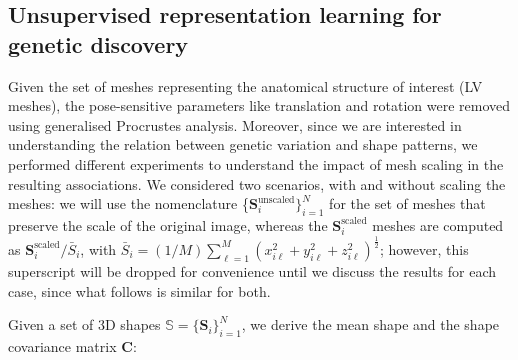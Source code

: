 


\subsection{Unsupervised representation learning for genetic discovery}
\label{results:dimensionality_reduction}
Given the set of meshes representing the anatomical structure of interest (LV meshes), the pose-sensitive parameters like translation and rotation were removed using generalised Procrustes analysis. Moreover, since we are interested in understanding the relation between genetic variation and shape patterns, we performed different experiments to understand the impact of mesh scaling in the resulting associations. We considered two scenarios, with and without scaling the meshes: we will use the nomenclature \{$\textbf{S}_{i}^{\text{unscaled}}\}_{i=1}^{N}$ for the set of meshes that preserve the scale of the original image, whereas the $\textbf{S}_{i}^{\text{scaled}}$ meshes are computed as $\textbf{S}_{i}^{\text{scaled}}/\bar{S}_i$, with $\bar{S}_i=(1/M)\sum_{\ell=1}^{M}(x_{i\ell}^2+y_{i\ell}^2+z_{i\ell}^2)^{\frac{1}{2}}$; however, this superscript will be dropped for convenience until we discuss the results for each case, since what follows is similar for both.

Given a set of 3D shapes $\mathbb{S}=\{\textbf{S}_i\}_{i=1}^{N}$, we derive the mean shape and the shape covariance matrix $\textbf{C}$:

